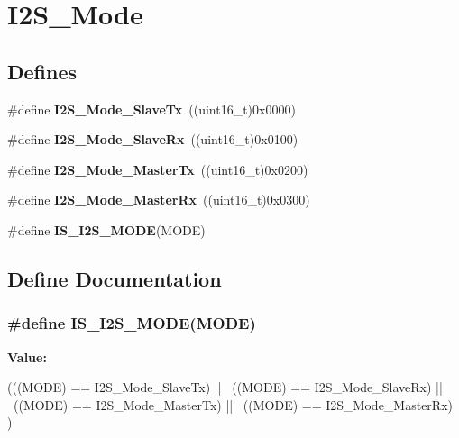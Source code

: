 \hypertarget{group__I2S__Mode}{
\section{I2S\_\-Mode}
\label{group__I2S__Mode}
}
\subsection*{Defines}
\begin{DoxyCompactItemize}
\item 
\hypertarget{group__I2S__Mode_gadd5b20277198fcdb6aa53ea48e802ae5}{
\#define {\bfseries I2S\_\-Mode\_\-SlaveTx}~((uint16\_\-t)0x0000)}
\label{group__I2S__Mode_gadd5b20277198fcdb6aa53ea48e802ae5}

\item 
\hypertarget{group__I2S__Mode_gaaf62ee0353476afc9612dc2933e1c5c5}{
\#define {\bfseries I2S\_\-Mode\_\-SlaveRx}~((uint16\_\-t)0x0100)}
\label{group__I2S__Mode_gaaf62ee0353476afc9612dc2933e1c5c5}

\item 
\hypertarget{group__I2S__Mode_ga3a62ee8964033a3f6fd030da9e40fba6}{
\#define {\bfseries I2S\_\-Mode\_\-MasterTx}~((uint16\_\-t)0x0200)}
\label{group__I2S__Mode_ga3a62ee8964033a3f6fd030da9e40fba6}

\item 
\hypertarget{group__I2S__Mode_gabf9f872cda7c0f159c5fc18aed44e973}{
\#define {\bfseries I2S\_\-Mode\_\-MasterRx}~((uint16\_\-t)0x0300)}
\label{group__I2S__Mode_gabf9f872cda7c0f159c5fc18aed44e973}

\item 
\#define {\bfseries IS\_\-I2S\_\-MODE}(MODE)
\end{DoxyCompactItemize}


\subsection{Define Documentation}
\hypertarget{group__I2S__Mode_ga942c37b2c1274c4c5773ddcf8b46d9b5}{
\subsubsection[{IS\_\-I2S\_\-MODE}]{\setlength{\rightskip}{0pt plus 5cm}\#define IS\_\-I2S\_\-MODE(MODE)}}
\label{group__I2S__Mode_ga942c37b2c1274c4c5773ddcf8b46d9b5}
{\bfseries Value:}
\begin{DoxyCode}
(((MODE) == I2S_Mode_SlaveTx) || \
                           ((MODE) == I2S_Mode_SlaveRx) || \
                           ((MODE) == I2S_Mode_MasterTx) || \
                           ((MODE) == I2S_Mode_MasterRx) )
\end{DoxyCode}

